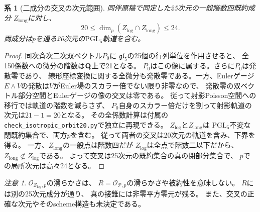 \documentclass[a4paper,11pt]{ltjsarticle}
\newtheorem{corollary}[theorem]{系}
\theoremstyle{remark}\newtheorem{remark}[theorem]{注意}
\begin{document}
\begin{corollary}[二成分の交叉の次元範囲]
\label{cor:log-long-intersection-orbit}
同伴原稿で同定した25次元の一般階数四既約成分
$Z_{\mathrm{long}}$に対し、
\[
 \boxed{\quad
 20\le\dim_p(Z_{\mathrm{log}}\cap Z_{\mathrm{long}})\le24.\quad}
\]
両成分は$p$を通る20次元の$\mathrm{PGL}_5$軌道を含む。
\end{corollary}
\begin{proof}
同次斉次二次双ベクトル$P_0$に
$\mathfrak{gl}_5$の25個の行列単位を作用させると、
全150係数への微分の階数は$\mathbf Q$上で21となる。
$P_0$はこの像に属する。さらに$P_0$は発散零であり、
線形座標変換に関する全微分も発散零である。一方、Eulerゲージ
$E\wedge V$の発散は$V$がEuler場のスカラー倍でない限り非零なので、
発散零の双ベクトル部分空間とEulerゲージの像の交叉は零である。
従って射影Poisson空間への移行では軌道の階数を減らさず、
$P_0$自身のスカラー倍だけを割って射影軌道の次元は$21-1=20$となる。
その全係数計算は付属の
\texttt{check\_isotropic\_orbit20.py}で独立に再現できる。
$Z_{\mathrm{log}}$と$Z_{\mathrm{long}}$は
$\mathrm{PGL}_5$不変な閉既約集合で、両方$p$を含む。
従って両者の交叉は20次元の軌道を含み、下界を得る。
一方、$Z_{\mathrm{long}}$の一般点は階数四だが
$Z_{\mathrm{log}}$は全点で階数二以下だから、
$Z_{\mathrm{long}}\not\subset Z_{\mathrm{log}}$である。
よって交叉は25次元の既約集合の真の閉部分集合で、
$p$での局所次元は高々24となる。
\end{proof}

\begin{remark}
$\mathcal O_{Z_{\mathrm{log}},p}$の滑らかさは、
$R=\mathcal O_{\mathcal P,p}$の滑らかさや被約性を意味しない。
$R$には別の25次元成分が通り、
真の接錐には非零平方零元が残る。
また、交叉の正確な次元やそのscheme構造も未決定である。
\end{remark}
\end{document}

